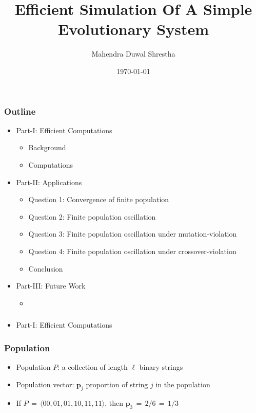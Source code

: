 \documentclass[aspectratio=169]{beamer}
\title{Efficient Simulation Of A Simple Evolutionary System}
\author{Mahendra Duwal Shrestha}
\institute{The University Of Tennessee}
\date{\today}
\begin{document}
  \begin{frame}
    \titlepage
  \end{frame}

  \begin{frame}
    \frametitle{Outline}
    \begin{itemize}
      \item Part-I: Efficient Computations
	\begin{itemize}
	  \item{Background}
	  \item{Computations}
	\end{itemize}
      \item Part-II: Applications
      \begin{itemize}
	\item{Question 1: Convergence of finite population}
	\item{Question 2: Finite population oscillation}
	\item{Question 3: Finite population oscillation under mutation-violation}
	\item{Question 4: Finite population oscillation under crossover-violation}
	\item{Conclusion}
      \end{itemize}
      
      \item Part-III: Future Work 
      \begin{itemize}
	\item{}
      \end{itemize}
    \end{itemize}
  \end{frame}
  
  \begin{frame}
    \frametitle{}
    \begin{itemize}
      \item Part-I: Efficient Computations
      \end{itemize}
    \end{frame}
  
  \begin{frame}
    \frametitle{Population}
    \begin{itemize}
      \item{Population $P$: a collection of length $\ell$ binary strings}
      \item{Population vector: $\bm{p}_j$ proportion of string $j$ in the population}
      \item{If $P \,=\, \langle 00, 01, 01, 10, 11, 11 \rangle$, then $\bm{p}_3 \,=\, 2/6 \,=\, 1/3$}
      \vspace{0.1in}%
    \end{itemize}
  \end{frame}
  
\end{document}
